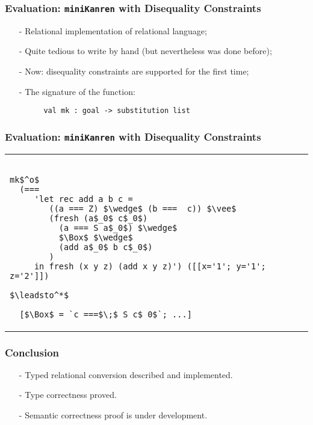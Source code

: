 \documentclass{beamer}
\newcommand{\miniKanren}{\texttt{miniKanren}\xspace}
\theoremstyle{definition}
\begin{document}
\begin{frame}[fragile]\frametitle{Evaluation: \miniKanren with Disequality Constraints}
\begin{itemize}    
    \item[-] Relational implementation of relational language;
    \item[-] Quite tedious to write by hand (but nevertheless was done before);
    \pause    
    \item[-] Now: disequality constraints are supported for the first time;
    \item[-] The signature of the function:
\end{itemize}
\vskip-3mm
\begin{lstlisting}
         val mk : goal -> substitution list
\end{lstlisting}
\end{frame}

\begin{frame}[fragile]\frametitle{Evaluation: \miniKanren with Disequality Constraints}

\begin{tabular}{l}
\begin{lstlisting}

mk$^o$
  (=== 
     'let rec add a b c =
        ((a === Z) $\wedge$ (b ===  c)) $\vee$
        (fresh (a$_0$ c$_0$)
          (a === S a$_0$) $\wedge$
          $\Box$ $\wedge$
          (add a$_0$ b c$_0$)
        )
     in fresh (x y z) (add x y z)') ([[x='1'; y='1'; z='2']])
  
$\leadsto^*$ 
  
  [$\Box$ = `c ===$\;$ S c$_0$`; ...]

\end{lstlisting}
\end{tabular}

\end{frame}


\begin{frame}\frametitle{Conclusion}

\begin{itemize}
    \item[-] Typed relational conversion described and implemented.
    \item[-] Type correctness proved.
    \item[-] Semantic correctness proof is under development.
\end{itemize}

\end{frame}

\begin{comment}

\end{comment}
\end{document}
